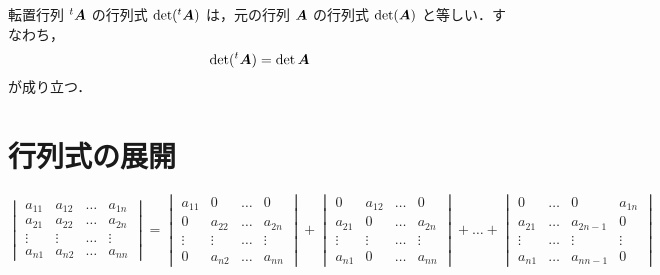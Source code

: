 \documentclass[leqno,autodetect-engine,dvipdfmx-if-dvi,ja=standard,a4paper,12pt]{bxjsbook}
\begin{document}
				\begin{thm} 転置行列 $ ^{t}\boldsymbol{A}$ の行列式 $\det( ^{t}\boldsymbol{A})$ は，元の行列 $\boldsymbol{A}$ の行列式 $\det(\boldsymbol{A})$ と等しい．すなわち，
					\begin{equation}
						\det( ^{t}\boldsymbol{A}) = \det{\boldsymbol{A}} 
					\end{equation}
					が成り立つ．
				\end{thm}

				\section{行列式の展開}
				
					\begin{thm}
						\begin{equation}
							\begin{vmatrix}
								a_{1 1} & a_{1 2} & \dots & a_{1 n} \\
								a_{2 1} & a_{2 2} & \dots & a_{2 n} \\
								\vdots & \vdots & \dots & \vdots \\
								a_{n 1} & a_{n 2} & \dots & a_{n n}
							\end{vmatrix}
							= \begin{vmatrix}
								a_{1 1} & 0 & \dots & 0 \\
								0 & a_{2 2} & \dots & a_{2 n} \\
								\vdots & \vdots & \dots & \vdots \\
								0 & a_{n 2} & \dots & a_{n n}
							\end{vmatrix}
							+ \begin{vmatrix}
								0 & a_{1 2} & \dots & 0 \\
								a_{2 1} & 0 & \dots & a_{2 n} \\
								\vdots & \vdots & \dots & \vdots \\
								a_{n 1} & 0 & \dots & a_{n n}
							\end{vmatrix}
							+ \dots + \begin{vmatrix}
								0 & \dots & 0 & a_{1 n} \\
								a_{2 1} & \dots & a_{2 n-1} & 0 \\
								\vdots & \dots & \vdots & \vdots \\
								a_{n 1} & \dots & a_{n n-1} & 0
							\end{vmatrix}
						\end{equation}
					\end{thm}
\end{document}
